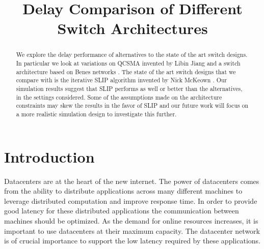 \documentclass{IEEEtran}%
\begin{document}
\title{Delay Comparison of Different Switch Architectures}



\author{}




\maketitle


\begin{abstract}
	We explore the delay performance of alternatives to the state of the art switch designs.  In particular we look at variations on QCSMA \cite{Libin} invented by Libin Jiang and a switch architecture based on Benes networks \cite{Walrand_Varaiya}.  The state of the art switch designs that we compare with is the iterative SLIP algorithm invented by Nick McKeown \cite{McKeown}.  Our simulation results suggest that SLIP performs as well or better than the alternatives, in the settings considered.  Some of the assumptions made on the architecture constraints may skew the results in the favor of SLIP and our future work will focus on a more realistic simulation design to investigate this further.
\end{abstract}


\section{Introduction}
Datacenters are at the heart of the new internet.  The power of datacenters comes from the ability to distribute applications across many different machines to leverage distributed computation and improve response time.  In order to provide good latency for these distributed applications the communication between machines should be optimized.   As the demand for online resources increases, it is important to use datacenters at their maximum capacity.  The datacenter network is of crucial importance to support the low latency required by these applications.
\end{document}
